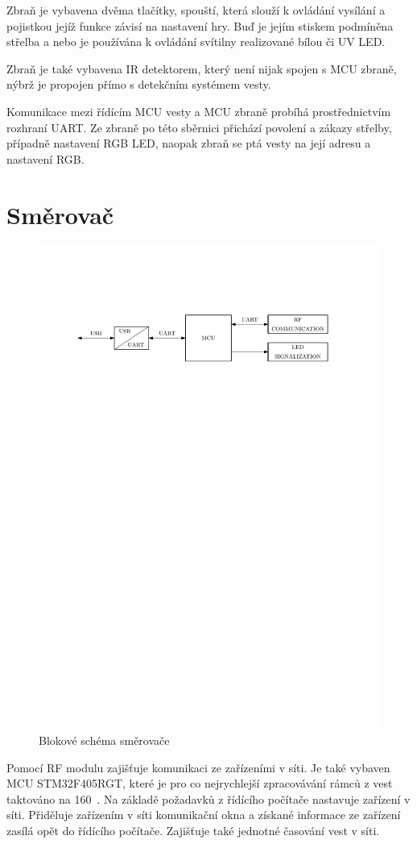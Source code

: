Zbraň je vybavena dvěma tlačítky, spouští, která slouží k ovládání vysílání a pojistkou jejíž funkce závisí na nastavení hry. Buď je jejím stiskem podmíněna střelba a nebo je používána k ovládání svítilny realizované bílou či UV LED.

Zbraň je také vybavena IR detektorem, který není nijak spojen s MCU zbraně, nýbrž je propojen přímo s detekčním systémem vesty.

Komunikace mezi řídícím MCU vesty a MCU zbraně probíhá prostřednictvím rozhraní UART. Ze zbraně po této sběrnici přichází povolení a zákazy střelby, případně nastavení RGB LED, naopak zbraň se ptá vesty na její adresu a nastavení RGB.

\section{Směrovač}
\begin{figure}[H]
    \begin{center}
        \includegraphics[width=\textwidth]{img/router}
    \end{center}
    \caption{Blokové schéma směrovače}
\end{figure}
Pomocí RF modulu zajišťuje komunikaci ze zařízeními v síti. Je také vybaven MCU STM32F405RGT, které je pro co nejrychlejší zpracovávání rámců z vest taktováno na 160~. Na základě požadavků z řídícího počítače nastavuje zařízení v síti. Přiděluje zařízením v síti komunikační okna a získané informace ze zařízení zasílá opět do řídícího počítače. Zajišťuje také jednotné časování vest v síti.
